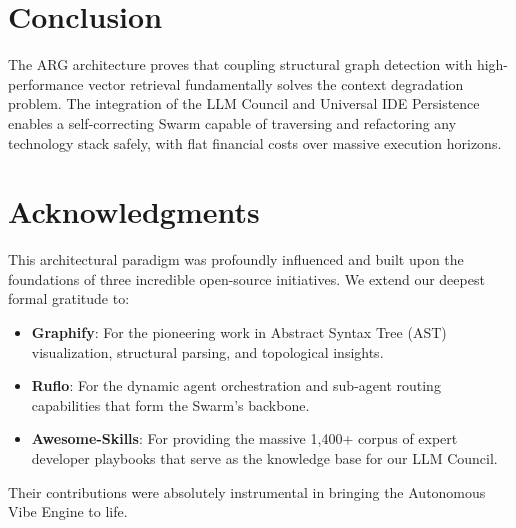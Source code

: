 \documentclass[10pt,twocolumn,letterpaper]{article}
\begin{document}
\section{Conclusion}
The ARG architecture proves that coupling structural graph detection with high-performance vector retrieval fundamentally solves the context degradation problem. The integration of the LLM Council and Universal IDE Persistence enables a self-correcting Swarm capable of traversing and refactoring any technology stack safely, with flat financial costs over massive execution horizons.

\section*{Acknowledgments}
This architectural paradigm was profoundly influenced and built upon the foundations of three incredible open-source initiatives. We extend our deepest formal gratitude to:
\begin{itemize}
    \item \textbf{Graphify}: For the pioneering work in Abstract Syntax Tree (AST) visualization, structural parsing, and topological insights.
    \item \textbf{Ruflo}: For the dynamic agent orchestration and sub-agent routing capabilities that form the Swarm's backbone.
    \item \textbf{Awesome-Skills}: For providing the massive 1,400+ corpus of expert developer playbooks that serve as the knowledge base for our LLM Council.
\end{itemize}
Their contributions were absolutely instrumental in bringing the Autonomous Vibe Engine to life.
\end{document}
